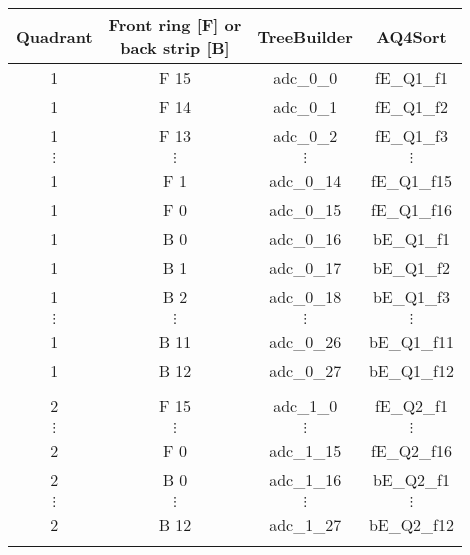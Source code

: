 \begin{tabular}{cccc}
\hline
Quadrant  &  \shortstack{Front ring [F] or \\ back strip [B]}  &  TreeBuilder  &  AQ4Sort      \\
\hline
1         &  F 15             				   				   &  adc\_0\_0    &  fE\_Q1\_f1   \\
1         &  F 14             				   				   &  adc\_0\_1    &  fE\_Q1\_f2   \\
1         &  F 13             				   				   &  adc\_0\_2    &  fE\_Q1\_f3   \\
$\vdots$  &  $\vdots$                  		   				   &  $\vdots$     &  $\vdots$     \\
1         &  F 1              				   				   &  adc\_0\_14   &  fE\_Q1\_f15  \\
1         &  F 0              				   				   &  adc\_0\_15   &  fE\_Q1\_f16  \\
1         &  B 0              				   				   &  adc\_0\_16   &  bE\_Q1\_f1   \\
1         &  B 1              				   				   &  adc\_0\_17   &  bE\_Q1\_f2   \\
1         &  B 2              				   				   &  adc\_0\_18   &  bE\_Q1\_f3   \\
$\vdots$  &  $\vdots$                  		   				   &  $\vdots$     &  $\vdots$     \\
1         &  B 11             				   				   &  adc\_0\_26   &  bE\_Q1\_f11  \\
1         &  B 12             				   				   &  adc\_0\_27   &  bE\_Q1\_f12  \\
          &                            		   				   &               &               \\
2         &  F 15             				   				   &  adc\_1\_0    &  fE\_Q2\_f1   \\
$\vdots$  &  $\vdots$                  		   				   &  $\vdots$     &  $\vdots$     \\
2         &  F 0              				   				   &  adc\_1\_15   &  fE\_Q2\_f16  \\
2         &  B 0              				   				   &  adc\_1\_16   &  bE\_Q2\_f1   \\
$\vdots$  &  $\vdots$                  		   				   &  $\vdots$     &  $\vdots$     \\
2         &  B 12             				   				   &  adc\_1\_27   &  bE\_Q2\_f12  \\
          &                            		   				   &               &               \\

\end{tabular}
